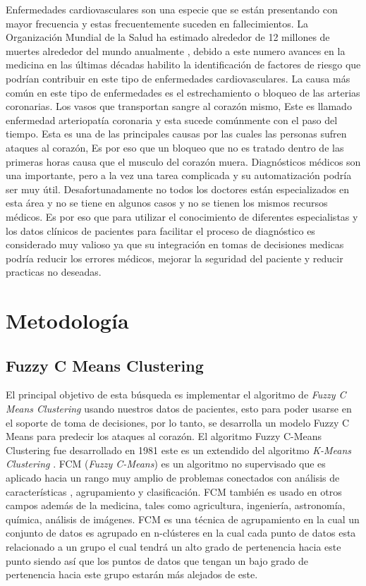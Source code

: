 \documentclass[10pt,journal]{IEEEtran}
\begin{document}
Enfermedades cardiovasculares son una especie que se están presentando con mayor frecuencia y estas frecuentemente suceden en fallecimientos. La Organización Mundial de la Salud ha estimado alrededor de 12 millones de muertes alrededor del mundo anualmente \cite{who_2022_cardiovascular}, debido a este numero avances en la medicina en las últimas décadas habilito la identificación de factores de riesgo que podrían contribuir en este tipo de enfermedades cardiovasculares. La causa más común en este tipo de enfermedades es el estrechamiento o bloqueo de las arterias coronarias. Los vasos que transportan sangre al corazón mismo, Este es llamado enfermedad arteriopatía coronaria y esta sucede comúnmente con el paso del tiempo. Esta es una de las principales causas por las cuales las personas sufren ataques al corazón, Es por eso que un bloqueo que no es tratado dentro de las primeras horas causa que el musculo del corazón muera. Diagnósticos médicos son una importante, pero a la vez una tarea complicada y su automatización podría ser muy útil. Desafortunadamente no todos los doctores están especializados en esta área y no se tiene en algunos casos y no se tienen los mismos recursos médicos. Es por eso que para utilizar el conocimiento de diferentes especialistas y los datos clínicos de pacientes para facilitar el proceso de diagnóstico es considerado muy valioso ya que su integración en tomas de decisiones medicas podría reducir los errores médicos, mejorar la seguridad del paciente y reducir practicas no deseadas.

\section{Metodología}
\label{sec:metodologia}


\subsection{Fuzzy C Means Clustering}

El principal objetivo de esta búsqueda es implementar el algoritmo de \textit{Fuzzy C Means Clustering} usando nuestros datos de pacientes, esto para poder usarse en el soporte de toma de decisiones, por lo tanto, se desarrolla un modelo Fuzzy C Means para predecir los ataques al corazón.
El algoritmo Fuzzy C-Means Clustering fue desarrollado en 1981 este es un extendido del algoritmo \textit{K-Means Clustering} \cite{articlePredictingFuzzyCMeans}.  FCM (\textit{Fuzzy C-Means}) es un algoritmo no supervisado que es aplicado hacia un rango muy amplio de problemas conectados con análisis de características , agrupamiento y clasificación. FCM también es usado en otros campos además de la medicina, tales como agricultura, ingeniería, astronomía, química, análisis de imágenes.
FCM es una técnica de agrupamiento en la cual un conjunto de datos es agrupado en n-clústeres en la cual cada punto de datos esta relacionado a un grupo el cual tendrá un alto grado de pertenencia hacia este punto siendo así que los puntos de datos que tengan un bajo grado de pertenencia hacia este grupo estarán más alejados de este.
\end{document}
